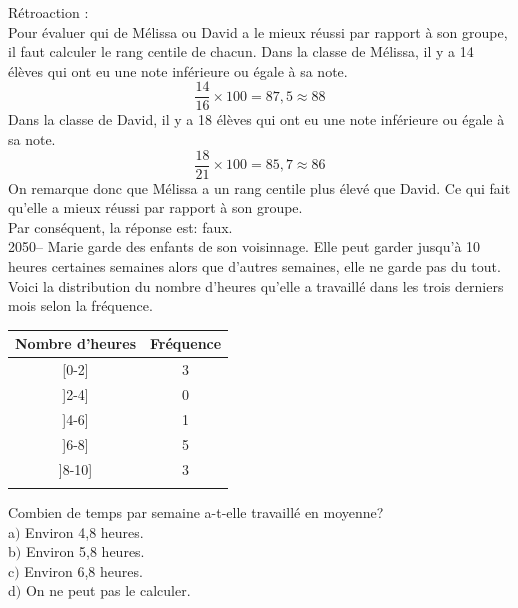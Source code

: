 \documentclass[letterpaper, 12pt]{article}
\begin{document}
R\'etroaction :\\
Pour \'evaluer qui de M\'elissa ou David a le mieux r\'eussi par rapport \`a son groupe, il faut calculer le rang centile de chacun. Dans la classe de M\'elissa, il y a 14 \'el\`eves qui ont eu une note inf\'erieure ou \'egale \`a sa note.
\begin{equation*}
 \frac{14}{16} \times 100 = 87,5 \approx 88
\end{equation*}
Dans la classe de David, il y a 18 \'el\`eves qui ont eu une note inf\'erieure ou \'egale \`a sa note.
\begin{equation*}
 \frac{18}{21} \times 100 = 85,7 \approx 86
\end{equation*}
On remarque donc que M\'elissa a un rang centile plus \'elev\'e que David. Ce qui fait qu'elle a mieux r\'eussi par rapport \`a son groupe.\\
Par cons\'equent, la r\'eponse est: faux.\\


2050-- Marie garde des enfants de son voisinnage. Elle peut garder jusqu'\`a 10 heures certaines semaines alors que d'autres semaines, elle ne garde pas du tout. Voici la distribution du nombre d'heures qu'elle a travaill\'e dans les trois derniers mois selon la fr\'equence.
\begin{center}
 \begin{tabular}{|c|c|} \hline
{\bf Nombre d'heures} & {\bf Fr\'equence}  \\ \hline \hline

[0-2] & 3 \\ \hline
]2-4] & 0 \\ \hline
 ]4-6] & 1 \\ \hline
  ]6-8] & 5 \\ \hline
  ]8-10] & 3 \\ \hline
\multicolumn{2}{c}{}\\
\end{tabular}
\end{center}

Combien de temps par semaine a-t-elle travaill\'e en moyenne?\\

a$)$ Environ 4,8 heures.\\
b$)$ Environ 5,8 heures.\\
c$)$ Environ 6,8 heures.\\
d$)$ On ne peut pas le calculer.\\
\end{document}
